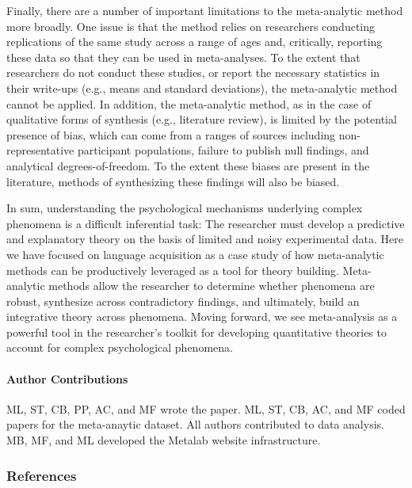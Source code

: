 \documentclass[english,floatsintext,man]{apa6}
\newcounter{author}
\begin{document}
Finally, there are a number of important limitations to the
meta-analytic method more broadly. One issue is that the method relies
on researchers conducting replications of the same study across a range
of ages and, critically, reporting these data so that they can be used
in meta-analyses. To the extent that researchers do not conduct these
studies, or report the necessary statistics in their write-ups (e.g.,
means and standard deviations), the meta-analytic method cannot be
applied. In addition, the meta-analytic method, as in the case of
qualitative forms of synthesis (e.g., literature review), is limited by
the potential presence of bias, which can come from a ranges of sources
including non-representative participant populations, failure to publish
null findings, and analytical degrees-of-freedom. To the extent these
biases are present in the literature, methods of synthesizing these
findings will also be biased.

In sum, understanding the psychological mechanisms underlying complex
phenomena is a difficult inferential task: The researcher must develop a
predictive and explanatory theory on the basis of limited and noisy
experimental data. Here we have focused on language acquisition as a
case study of how meta-analytic methods can be productively leveraged as
a tool for theory building. Meta-analytic methods allow the researcher
to determine whether phenomena are robust, synthesize across
contradictory findings, and ultimately, build an integrative theory
across phenomena. Moving forward, we see meta-analysis as a powerful
tool in the researcher's toolkit for developing quantitative theories to
account for complex psychological phenomena.

\paragraph{Author Contributions}\label{author-contributions}

ML, ST, CB, PP, AC, and MF wrote the paper. ML, ST, CB, AC, and MF coded
papers for the meta-anaytic dataset. All authors contributed to data
analysis. MB, MF, and ML developed the Metalab website infrastructure.

\newpage

\subsubsection{References}\label{references}

\setlength{\parindent}{-0.5in} \setlength{\leftskip}{0.5in}
\setlength{\parskip}{8pt}
\end{document}
